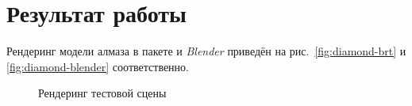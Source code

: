 \documentclass[a4paper,10pt]{article}
\begin{document}
\section{Результат работы}
Рендеринг модели алмаза в пакете и \textit{Blender} приведён на рис.~\ref{fig:diamond-brt} и \ref{fig:diamond-blender} соответственно.

\begin{figure}
  \centering
  \quad
  \caption{Рендеринг тестовой сцены}
  \label{fig:prism-test-results}
\end{figure}



\end{document}
